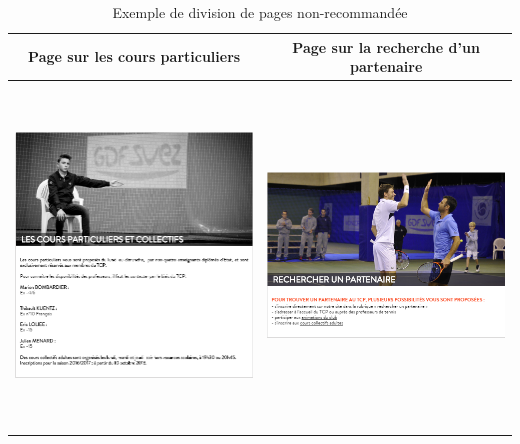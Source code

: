 \documentclass{article}[12pt]
\begin{document}
    \begin{table}[H]
    	\centering
    	\begin{tabular}[b]{|c|c|}
    		\hline
    		\textbf{Page sur les cours particuliers} & \textbf{Page sur la recherche d'un partenaire } \\
    		\hline
    		\includegraphics[width=7cm,height=9.1cm]{6_4_expl.PNG} &\includegraphics[width=7cm,height=9.1cm]{6_4_expl2.PNG}\\
    		\hline
    	\end{tabular}
    	\caption{Exemple de division de pages non-recommandée}
    \end{table}
\newpage
\end{document}
